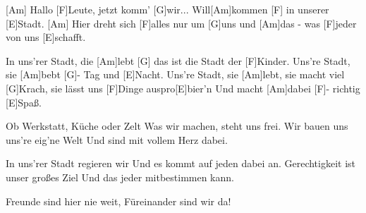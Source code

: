 

\begin{guitar}
	[Am] Hallo [F]Leute, jetzt komm' [G]wir...
	Will[Am]kommen [F] in unserer [E]Stadt.
	[Am] Hier dreht sich [F]alles nur um [G]uns
	und [Am]das - was [F]jeder von uns [E]schafft.
	
	In uns'rer Stadt, die [Am]lebt [G]
	das ist die Stadt der [F]Kinder.
	Uns're Stadt, sie [Am]bebt [G]- Tag und [E]Nacht.
	Uns're Stadt, sie [Am]lebt, sie macht viel [G]Krach, sie lässt uns [F]Dinge auspro[E]bier'n
	Und macht [Am]dabei [F]- richtig [E]Spaß.
	
	Ob Werkstatt, Küche oder Zelt
	Was wir machen, steht uns frei.
	Wir bauen uns uns're eig'ne Welt
	Und sind mit vollem Herz dabei.
	
	 
	
	In uns'rer Stadt regieren wir
	Und es kommt auf jeden dabei an.
	Gerechtigkeit ist unser großes Ziel
	Und das jeder mitbestimmen kann.
	
	 
	
	Freunde sind hier nie weit,
	Füreinander sind wir da!
	
	 
\end{guitar}